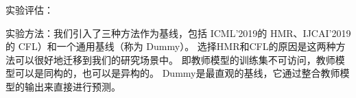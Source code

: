 \documentclass[fontset=macnew,UTF8]{article} %
\begin{document}
实验评估：

实验方法：我们引入了三种方法作为基线，包括 ICML’2019\cite{wu2019heterogeneous}的 HMR、IJCAI’2019\cite{luo2019knowledge}的 CFL）和一个通用基线（称为
Dummy）。 选择HMR和CFL的原因是这两种方法可以很好地迁移到我们的研究场景中。 即教师模型的训练集不可访问，教师模型可以是同构的，也可以是异构的。 Dummy是最直观的基线，它通过整合教师模型的输出来直接进行预测。

\begin{figure}[h!]
\end{figure}
\end{document}
